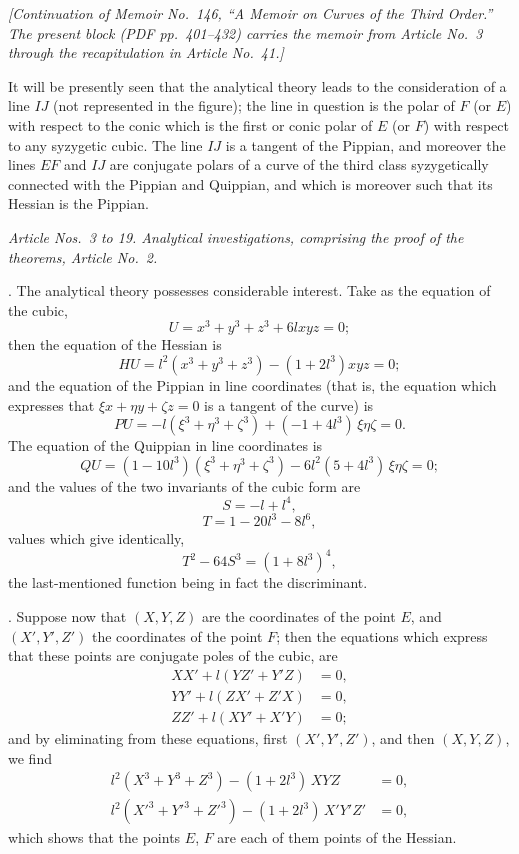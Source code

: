 \documentclass[11pt]{article}
\begin{document}

\noindent\textit{[Continuation of Memoir No.~146, ``A Memoir on Curves of the Third Order.'' The present block (PDF pp.~401--432) carries the memoir from Article No.~3 through the recapitulation in Article No.~41.]}

\bigskip

\noindent It will be presently seen that the analytical theory leads to the consideration of a line $IJ$ (not represented in the figure); the line in question is the polar of $F$ (or $E$) with respect to the conic which is the first or conic polar of $E$ (or $F$) with respect to any syzygetic cubic. The line $IJ$ is a tangent of the Pippian, and moreover the lines $EF$ and $IJ$ are conjugate polars of a curve of the third class syzygetically connected with the Pippian and Quippian, and which is moreover such that its Hessian is the Pippian.

\medskip

\textit{Article Nos.~3 to 19. Analytical investigations, comprising the proof of the theorems, Article No.~2.}

\medskip

. The analytical theory possesses considerable interest. Take as the equation of the cubic,
\[
U = x^3 + y^3 + z^3 + 6 l x y z = 0;
\]
then the equation of the Hessian is
\[
HU = l^2 (x^3 + y^3 + z^3) - (1 + 2 l^3) x y z = 0;
\]
and the equation of the Pippian in line coordinates (that is, the equation which expresses that $\xi x + \eta y + \zeta z = 0$ is a tangent of the curve) is
\[
PU = -l(\xi^3 + \eta^3 + \zeta^3) + (-1 + 4 l^3)\,\xi\eta\zeta = 0.
\]
The equation of the Quippian in line coordinates is
\[
QU = (1 - 10 l^3)(\xi^3 + \eta^3 + \zeta^3) - 6 l^2 (5 + 4 l^3)\,\xi\eta\zeta = 0;
\]
and the values of the two invariants of the cubic form are
\[
S = -l + l^4,
\]
\[
T = 1 - 20 l^3 - 8 l^6,
\]
values which give identically,
\[
T^2 - 64 S^3 = (1 + 8 l^3)^4,
\]
the last-mentioned function being in fact the discriminant.

\medskip

. Suppose now that $(X, Y, Z)$ are the coordinates of the point $E$, and $(X', Y', Z')$ the coordinates of the point $F$; then the equations which express that these points are conjugate poles of the cubic, are
\begin{align*}
X X' + l(Y Z' + Y' Z) &= 0, \\
Y Y' + l(Z X' + Z' X) &= 0, \\
Z Z' + l(X Y' + X' Y) &= 0;
\end{align*}
and by eliminating from these equations, first $(X', Y', Z')$, and then $(X, Y, Z)$, we find
\begin{align*}
l^2 (X^3 + Y^3 + Z^3) - (1 + 2 l^3)\, X Y Z &= 0, \\
l^2 (X'^3 + Y'^3 + Z'^3) - (1 + 2 l^3)\, X' Y' Z' &= 0,
\end{align*}
which shows that the points $E$, $F$ are each of them points of the Hessian.
\end{document}
